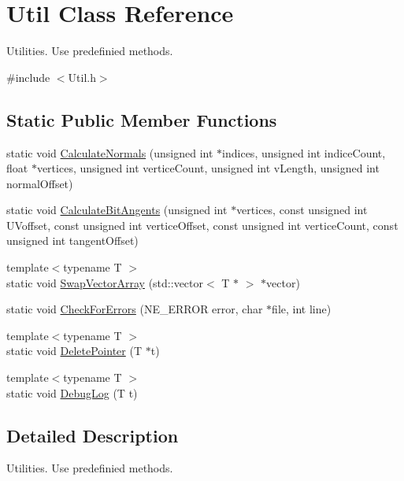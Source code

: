 \hypertarget{class_util}{}\section{Util Class Reference}
\label{class_util}


Utilities. Use predefinied methods.  




{\ttfamily \#include $<$Util.\+h$>$}

\subsection*{Static Public Member Functions}
\begin{DoxyCompactItemize}
\item 
static void \mbox{\hyperlink{class_util_ad2e7395962790b29850386ec1b67b0b4}{Calculate\+Normals}} (unsigned int $\ast$indices, unsigned int indice\+Count, float $\ast$vertices, unsigned int vertice\+Count, unsigned int v\+Length, unsigned int normal\+Offset)
\item 
static void \mbox{\hyperlink{class_util_ae720e205587c192a38b9f304cdbde242}{Calculate\+Bit\+Angents}} (unsigned int $\ast$vertices, const unsigned int U\+Voffset, const unsigned int vertice\+Offset, const unsigned int vertice\+Count, const unsigned int tangent\+Offset)
\item 
{\footnotesize template$<$typename T $>$ }\\static void \mbox{\hyperlink{class_util_affee8f024e5e4bd88fb0bd79e37c2186}{Swap\+Vector\+Array}} (std\+::vector$<$ T $\ast$ $>$ $\ast$vector)
\item 
static void \mbox{\hyperlink{class_util_a17188b444f62e6ed4e8644b3fcefd1c5}{Check\+For\+Errors}} (N\+E\+\_\+\+E\+R\+R\+OR error, char $\ast$file, int line)
\item 
{\footnotesize template$<$typename T $>$ }\\static void \mbox{\hyperlink{class_util_a3f368c839c02137364295ed412f5b715}{Delete\+Pointer}} (T $\ast$t)
\item 
{\footnotesize template$<$typename T $>$ }\\static void \mbox{\hyperlink{class_util_a96f8de6fe6bf7935cc82954954f10086}{Debug\+Log}} (T t)
\end{DoxyCompactItemize}


\subsection{Detailed Description}
Utilities. Use predefinied methods. 

